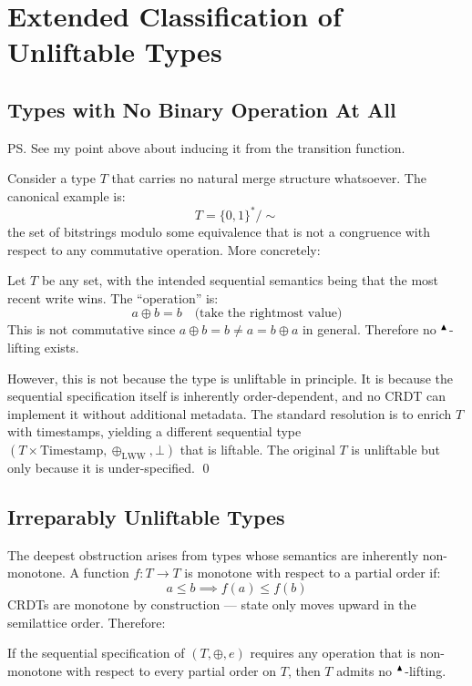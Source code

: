 \section{Extended Classification of Unliftable Types} \label{sec:classification}

\subsection{Types with No Binary Operation At All}

\ps{See my point above about inducing it from the transition function.}

Consider a type $T$ that carries no natural merge structure whatsoever. The canonical example is:
\[
T = \{0, 1\}^* / \sim
\]
the set of bitstrings modulo some equivalence that is not a congruence with respect to any commutative operation. More concretely:

\begin{corollary}
Let $T$ be any set, with the intended sequential semantics being that the most recent write wins. The ``operation'' is:
\[
a \oplus b = b \quad \text{(take the rightmost value)}
\]
This is not commutative since $a \oplus b = b \neq a = b \oplus a$ in general. Therefore no ${}^{\blacktriangle}{}$-lifting exists.
\end{corollary}

However, this is not because the type is unliftable in principle. It is because the sequential specification itself is inherently order-dependent, and no CRDT can implement it without additional metadata. The standard resolution is to enrich $T$ with timestamps, yielding a different sequential type $(T \times \text{Timestamp}, \oplus_{\text{LWW}}, \bot)$ that is liftable. The original $T$ is unliftable but only because it is under-specified. \qed


\subsection{Irreparably Unliftable Types}

The deepest obstruction arises from types whose semantics are inherently non-monotone. A function $f : T \to T$ is monotone with respect to a partial order if:
\[
a \leq b \implies f(a) \leq f(b)
\]
CRDTs are monotone by construction --- state only moves upward in the semilattice order. Therefore:

\begin{theorem}
If the sequential specification of $(T, \oplus, e)$ requires any operation that is non-monotone with respect to every partial order on $T$, then $T$ admits no ${}^{\blacktriangle}{}$-lifting.
\end{theorem}

